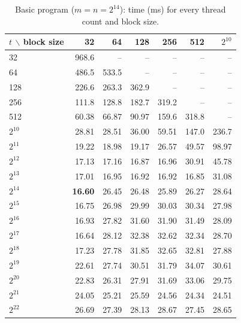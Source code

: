 \begin{table}[H]\centering\small
\caption{Basic program ($m=n=2^{14}$): time (ms) for every thread count and block size.}\label{tab:q2basicbs}
\begin{tabular}{lrrrrrr}
\toprule
$t$ $\backslash$ block size & 32 & 64 & 128 & 256 & 512 & $2^{10}$ \\
\midrule
32 & 968.6 & -- & -- & -- & -- & -- \\
64 & 486.5 & 533.5 & -- & -- & -- & -- \\
128 & 226.6 & 263.3 & 362.9 & -- & -- & -- \\
256 & 111.8 & 128.8 & 182.7 & 319.2 & -- & -- \\
512 & 60.38 & 66.87 & 90.97 & 159.6 & 318.8 & -- \\
$2^{10}$ & 28.81 & 28.51 & 36.00 & 59.51 & 147.0 & 236.7 \\
$2^{11}$ & 19.22 & 18.98 & 19.17 & 26.57 & 49.57 & 98.97 \\
$2^{12}$ & 17.13 & 17.16 & 16.87 & 16.96 & 30.91 & 45.78 \\
$2^{13}$ & 17.01 & 16.95 & 16.92 & 16.92 & 16.85 & 31.08 \\
$2^{14}$ & \textbf{16.60} & 26.45 & 26.48 & 25.89 & 26.27 & 28.64 \\
$2^{15}$ & 16.75 & 26.98 & 29.99 & 30.03 & 30.34 & 27.98 \\
$2^{16}$ & 16.93 & 27.82 & 31.60 & 31.90 & 31.49 & 28.09 \\
$2^{17}$ & 16.64 & 28.12 & 32.38 & 32.62 & 32.34 & 28.70 \\
$2^{18}$ & 17.23 & 27.78 & 31.85 & 32.65 & 32.81 & 27.88 \\
$2^{19}$ & 22.61 & 27.74 & 30.51 & 31.79 & 34.07 & 30.61 \\
$2^{20}$ & 22.83 & 26.31 & 27.91 & 31.69 & 33.06 & 29.75 \\
$2^{21}$ & 24.05 & 25.21 & 25.59 & 24.56 & 24.34 & 24.51 \\
$2^{22}$ & 26.69 & 27.39 & 28.13 & 28.67 & 27.45 & 28.65 \\
\bottomrule
\end{tabular}
\end{table}
